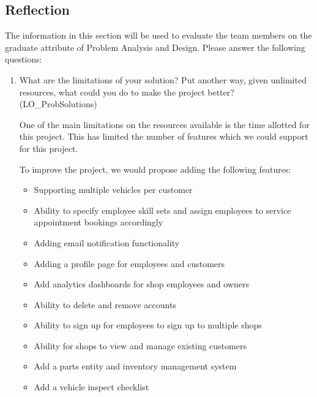 \documentclass[12pt, titlepage]{article}
\begin{document}


\subsection{Reflection}

The information in this section will be used to evaluate the team members on the graduate attribute
of Problem Analysis and Design. Please answer the following questions:

\begin{enumerate}
	\item What are the limitations of your solution? Put another way, given unlimited resources, what could
	      you do to make the project better? (LO\_ProbSolutions)

	      One of the main limitations on the resources available is the time allotted for this project. This
	      has limited the number of features which we could support for this project.

	      To improve the project, we would propose adding the following features:
	      \begin{itemize}
		      \item Supporting multiple vehicles per customer
		      \item Ability to specify employee skill sets and assign employees to service appointment bookings
		            accordingly
		      \item Adding email notification functionality
		      \item Adding a profile page for employees and customers
		      \item Add analytics dashboards for shop employees and owners
		      \item Ability to delete and remove accounts
		      \item Ability to sign up for employees to sign up to multiple shops
		      \item Ability for shops to view and manage existing customers
		      \item Add a parts entity and inventory management system
		      \item Add a vehicle inspect checklist
	      \end{itemize}


\end{enumerate}
\end{document}
